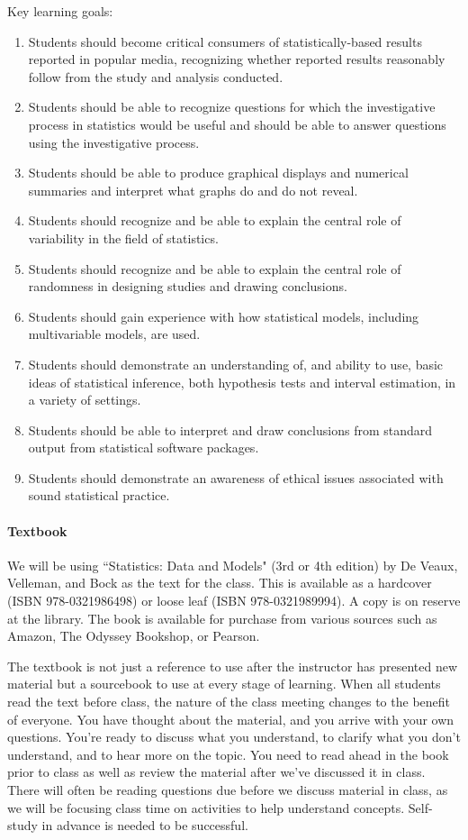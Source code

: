 \documentclass[11pt]{article}
\begin{document}
Key learning goals:
\begin{enumerate}
\item Students should become critical consumers of statistically-based results reported in popular media, recognizing whether reported results reasonably follow from the study and analysis conducted.
\item Students should be able to recognize questions for which the investigative process in statistics would be useful and should be able to answer questions using the investigative process. 
\item Students should be able to produce graphical displays and numerical summaries and interpret what graphs do and do not reveal. 
\item Students should recognize and be able to explain the central role of variability in the field of statistics. 
\item Students should recognize and be able to explain the central role of randomness in designing studies and drawing conclusions.
\item Students should gain experience with how statistical models, including multivariable models, are used.
\item Students should demonstrate an understanding of, and ability to use, basic ideas of statistical inference, both hypothesis tests and interval estimation, in a variety of settings.
\item Students should be able to interpret and draw conclusions from standard output from statistical software packages.
\item Students should demonstrate an awareness of ethical issues associated with sound statistical practice.
\end{enumerate}


\paragraph{Textbook}

We will be using ``Statistics: Data and Models" (3rd or 4th edition) by De Veaux, Velleman, and Bock as the text for the class.  This is available as a 
hardcover (ISBN 978-0321986498) or loose leaf (ISBN 978-0321989994).
A copy is on reserve at the library.
The book is available for purchase from various sources such as Amazon, The Odyssey Bookshop, or Pearson.

The textbook is not just a reference to use after the instructor has presented new material but a sourcebook to use at every stage of learning.  When all students read the text before class, the nature of the class meeting changes to the benefit of everyone.  You have thought about the material, and you arrive with your own questions.  You're ready to discuss what you understand, to clarify what you don't understand, and to hear more on the topic. You need to read ahead in the book prior to class as well as review the material after we've discussed it in class.  There will often be reading questions due before we discuss material in class, as we will be focusing class time on activities to help understand concepts. 
Self-study in advance is needed to be successful.  
\end{document}
